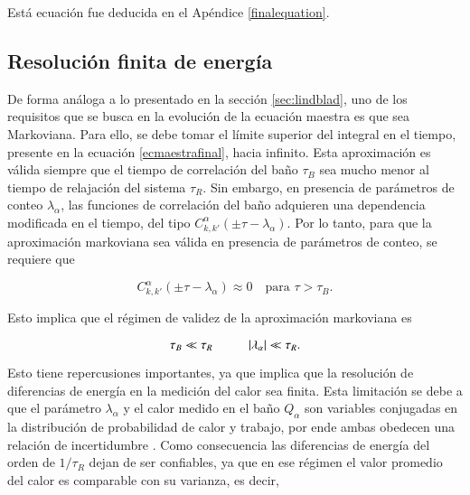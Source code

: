Está ecuación fue deducida en el Apéndice \ref{finalequation}.

\label{sec2:master}

\subsection{Resolución finita de energía}
De forma análoga a lo presentado en la sección \ref{sec:lindblad}, uno de los requisitos que se busca en la evolución de la ecuación maestra es que sea Markoviana. Para ello, se debe tomar el límite superior del integral en el tiempo, presente en la ecuación \ref{ecmaestrafinal}, hacia infinito. Esta aproximación es válida siempre que el tiempo de correlación del baño $\tau_{B}$ sea mucho menor al tiempo de relajación del sistema $\tau_{R}$. Sin embargo, en presencia de parámetros de conteo $\lambda_{\alpha}$, las funciones de correlación del baño adquieren una dependencia modificada en el tiempo, del tipo $C^{\alpha}_{k,k'}(\pm \tau - \lambda_\alpha)$. Por lo tanto, para que la aproximación markoviana sea válida en presencia de parámetros de conteo, se requiere que 

\begin{equation*}
    C^{\alpha}_{k,k'}(\pm \tau - \lambda_\alpha) \approx 0 \quad \text{para } \tau > \tau_{B}.
\end{equation*}

Esto implica que el régimen de validez de la aproximación markoviana es 

\begin{equation*}
    \tau_{B} \ll \tau_{R} \hspace{10mm} |\lambda_{\alpha}| \ll \tau_{R}.
\end{equation*}

Esto tiene repercusiones importantes, ya que implica que la resolución de diferencias de energía en la medición del calor sea finita. Esta limitación se debe a que el parámetro $\lambda_{\alpha}$ y el calor medido en el baño $Q_{\alpha}$ son variables conjugadas en la distribución de probabilidad de calor y trabajo, por ende ambas obedecen una relación de incertidumbre \cite{folland1997uncertainty}. Como consecuencia las diferencias de energía del orden de $1/\tau_{R}$ dejan de ser confiables, ya que en ese régimen el valor promedio del calor es comparable con su varianza, es decir,

